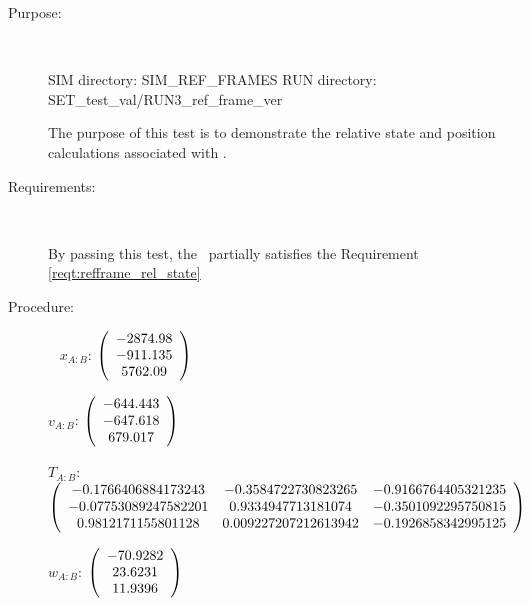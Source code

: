 \label{test:refframe_test_6}
\begin{description}
\item[Purpose:] \ \newline

SIM directory: SIM\_REF\_FRAMES
RUN directory: SET\_test\_val/RUN3\_ref\_frame\_ver

The purpose of this test is to demonstrate the relative state and
position calculations associated with .

\item[Requirements:] \ \newline

By passing this test, the \ partially satisfies
the Requirement \ref{reqt:refframe_rel_state}

\item[Procedure:] \ \newline
$x_{A:B}$:  $\left( \begin{array} {ccc}  -2874.98 \\   -911.135 \\    5762.09
\end{array} \right)\\ \\$

$v_{A:B}$:   $\left( \begin{array} {ccc}  -644.443 \\   -647.618 \\    679.017
\end{array} \right)\\ \\$

$T_{A:B}$:   $\left( \begin{array} {ccc}
 -0.1766406884173243 & -0.3584722730823265 & -0.9166764405321235 \\
  -0.07753089247582201 & 0.9334947713181074 & -0.3501092295750815 \\
   0.9812171155801128 & 0.009227207212613942 & -0.1926858342995125
\end{array} \right)\\ \\$

$w_{A:B}$:   $\left( \begin{array} {ccc}  -70.9282 \\    23.6231 \\    11.9396
\end{array} \right)\\ \\$


\end{description}
